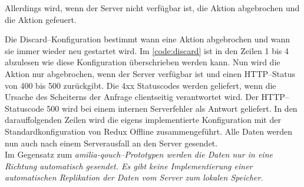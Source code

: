 Allerdings wird, wenn der Server nicht verfügbar ist, die Aktion abgebrochen und die  Aktion gefeuert.
\begin{center}
  
\end{center}
%
Die Discard--Konfiguration bestimmt wann eine Aktion abgebrochen und wann sie immer wieder neu gestartet wird.
Im \autoref{code:discard} ist in den Zeilen 1 bis 4 abzulesen wie diese Konfiguration überschrieben werden kann.
Nun wird die Aktion nur abgebrochen, wenn der Server verfügbar ist und einen \gls{HTTP}--Status von 400 bis 500 zurückgibt.
Die 4xx Statuscodes werden geliefert, wenn die Ursache des Scheiterns der Anfrage clientseitig verantwortet wird. Der \gls{HTTP}--Statuscode 500 wird bei einem internen Serverfehler als Antwort geliefert. 
In den darauffolgenden Zeilen wird die eigens implementierte Konfiguration mit der Standardkonfiguration von Redux Offline zusammengeführt.
Alle Daten werden nun auch nach einem Serverausfall an den Server gesendet.\\
Im Gegensatz zum \it{amilia-qouch}--Prototypen werden die Daten nur in eine Richtung automatisch gesendet.
Es gibt keine Implementierung einer automatischen Replikation der Daten vom Server zum lokalen Speicher.